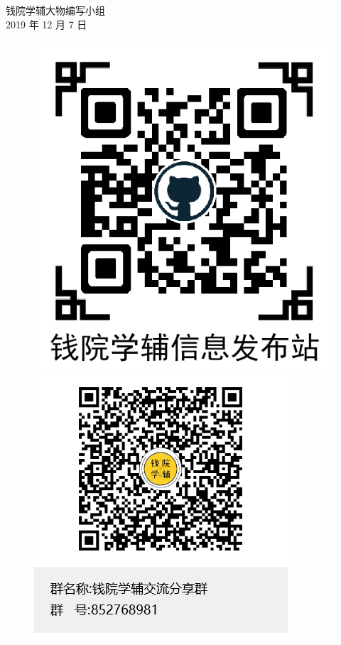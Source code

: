 \begin{flushright}
	钱院学辅大物编写小组\\
	2019 年 12 月 7 日
\end{flushright}
\vspace{1.0cm}
\begin{figure}[!h]
	\centering
	\begin{minipage}[c]{0.5\textwidth}
		\centering
		\includegraphics[scale=0.5]{./template/qrcode2.png}
	\end{minipage}%
	\begin{minipage}[c]{0.5\textwidth}
		\centering
		\includegraphics[scale=0.5]{./template/new_group.png}
	\end{minipage}
\end{figure}


\cleardoublepage
\tableofcontents

